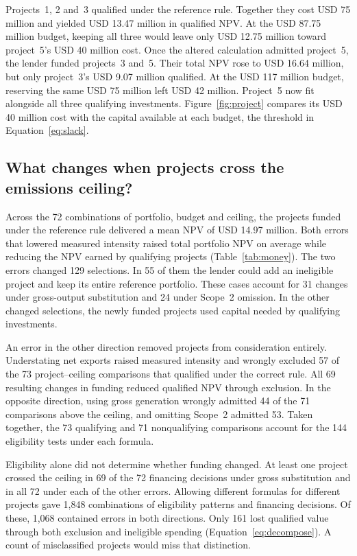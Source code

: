 Projects~1, 2 and~3 qualified under the reference rule. Together they cost USD 75 million and yielded USD 13.47 million in qualified NPV. At the USD 87.75 million budget, keeping all three would leave only USD 12.75 million toward project~5's USD 40 million cost. Once the altered calculation admitted project~5, the lender funded projects~3 and~5. Their total NPV rose to USD 16.64 million, but only project~3's USD 9.07 million qualified. At the USD 117 million budget, reserving the same USD 75 million left USD 42 million. Project~5 now fit alongside all three qualifying investments. Figure~\ref{fig:project} compares its USD 40 million cost with the capital available at each budget, the threshold in Equation~\eqref{eq:slack}.
\ifdefined\readingcopy\fi



\subsection{What changes when projects cross the emissions ceiling?}
Across the 72 combinations of portfolio, budget and ceiling, the projects funded under the reference rule delivered a mean NPV of USD 14.97 million. Both errors that lowered measured intensity raised total portfolio NPV on average while reducing the NPV earned by qualifying projects (Table~\ref{tab:money}). The two errors changed 129 selections. In 55 of them the lender could add an ineligible project and keep its entire reference portfolio. These cases account for 31 changes under gross-output substitution and 24 under Scope~2 omission. In the other changed selections, the newly funded projects used capital needed by qualifying investments.
\ifdefined\readingcopy\fi



An error in the other direction removed projects from consideration entirely. Understating net exports raised measured intensity and wrongly excluded 57 of the 73 project--ceiling comparisons that qualified under the correct rule. All 69 resulting changes in funding reduced qualified NPV through exclusion. In the opposite direction, using gross generation wrongly admitted 44 of the 71 comparisons above the ceiling, and omitting Scope~2 admitted 53. Taken together, the 73 qualifying and 71 nonqualifying comparisons account for the 144 eligibility tests under each formula.

Eligibility alone did not determine whether funding changed. At least one project crossed the ceiling in 69 of the 72 financing decisions under gross substitution and in all 72 under each of the other errors. Allowing different formulas for different projects gave 1,848 combinations of eligibility patterns and financing decisions. Of these, 1,068 contained errors in both directions. Only 161 lost qualified value through both exclusion and ineligible spending (Equation~\eqref{eq:decompose}). A count of misclassified projects would miss that distinction.


